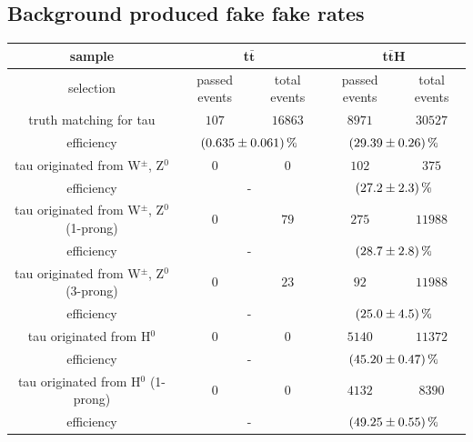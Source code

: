 \subsection{Background produced fake fake rates}
%	
	\begin{table}
		\centering
                \footnotesize
                \renewcommand{\arraystretch}{1.2}
		\begin{tabular*}{\linewidth}{@{\extracolsep{\fill}}ccccc}
		\hline
		\hline
		 \textbf{sample}  & \multicolumn{2}{c}{\textbf{t$\bar{\textbf{t}}$}}  & \multicolumn{2}{c}{\textbf{t$\bar{\textbf{t}}$H}} 
		\\
		\hline
		selection  & passed events      & total events & passed events      & total events
		\\ 
		\hline
		truth matching for tau      & $107$            & $16863$      & $8971$        & $30527$
		\\
		efficiency                  & \multicolumn{2}{c}{$\SI{0.635\pm 0.061}{\percent}$}    & \multicolumn{2}{c}{$\SI{29.39\pm 0.26}{\percent}$}
		\\
		\hline
		tau originated from W$^{\pm}$, Z$^0$& $0$        & $0$         & $102$          & $375$
		\\
		efficiency                  & \multicolumn{2}{c}{-}   & \multicolumn{2}{c}{$\SI{27.2\pm 2.3}{\percent}$}
		\\
		\hline
                tau originated from W$^{\pm}$, Z$^0$ (1-prong)& $0$        & $79$         & $275$          & $11988$
		\\
		efficiency                  & \multicolumn{2}{c}{-}   & \multicolumn{2}{c}{$\SI{28.7\pm 2.8}{\percent}$}
		\\
		\hline
                tau originated from W$^{\pm}$, Z$^0$ (3-prong)& $0$        & $23$         & $92$          & $11988$
		\\
		efficiency                  & \multicolumn{2}{c}{-}   & \multicolumn{2}{c}{$\SI{25.0\pm 4.5}{\percent}$}
		\\
		\hline
                tau originated from H$^0$& $0$        & $0$         & $5140$          & $11372$
		\\
		efficiency                  & \multicolumn{2}{c}{-}   & \multicolumn{2}{c}{$\SI{45.20\pm 0.47}{\percent}$}
		\\
		\hline
                tau originated from H$^0$ (1-prong)& $0$        & $0$         & $4132$          & $8390$
		\\
		efficiency                  & \multicolumn{2}{c}{-}   & \multicolumn{2}{c}{$\SI{49.25\pm 0.55}{\percent}$}

\end{tabular*}
\end{table}
